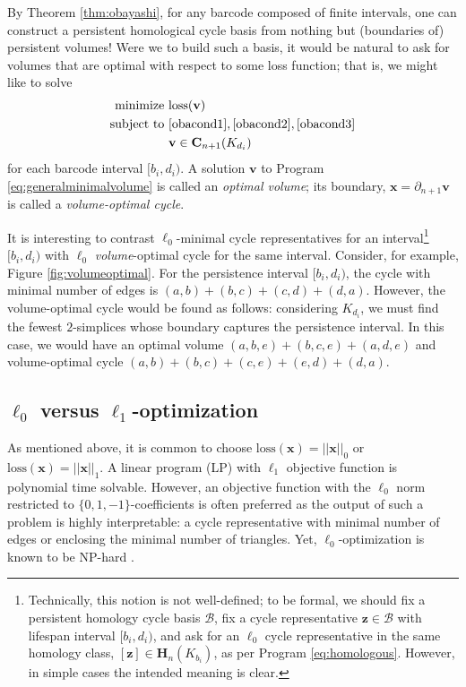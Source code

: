 \documentclass[utf8]{formatting_stuff/frontiersFPHY}
\newcommand{\Chains}{\mathbf{C}}
\newcommand{\Homologies}[0]{\mathbf{H}}
\newcommand{\optimalrep}{\mathbf{x}}
\newcommand{\cycle}{{\mathbf z}}
\newcommand{\fig}{Figure }
\newcommand{\volvec}{\mathbf{v}}
\newcommand{\loss}{\mathrm{loss}}
\newcommand{\pr}{Program }
\newcommand{\hcyclebasis}{\mathcal B}
\theoremstyle{plain}
\theoremstyle{definition}
\begin{document}
By Theorem \ref{thm:obayashi}, for any barcode composed of finite intervals, one can construct a persistent homological cycle basis from nothing but (boundaries of) persistent volumes!  Were we to build such a basis, it would be natural to ask for volumes that are optimal with respect to some loss function; that is, we might like to solve
\begin{align}
\begin{split}
    \text{minimize } & \loss(\volvec) \\
    \text{subject to } 
    & \eqref{obacond1}, \eqref{obacond2}, \eqref{obacond3}\\
    & \textbf{v} \in \Chains_{n+1}(K_{d_i}) 
\end{split}
\label{eq:generalminimalvolume}
\end{align}
for each barcode interval $[b_i, d_i)$.  A solution $\volvec$ to \pr \eqref{eq:generalminimalvolume} is called an \emph{optimal volume}; its boundary, $\optimalrep=\partial_{n+1}\volvec$ is called a \emph{volume-optimal cycle}.

It is interesting to contrast $\ell_0$-minimal cycle representatives for an interval\footnote{Technically, this notion is not well-defined; to be formal, we should fix a persistent homology cycle basis $\hcyclebasis$, fix a cycle representative $\cycle \in \hcyclebasis$ with lifespan interval $[b_i, d_i)$, and ask for an $\ell_0$ cycle representative in the same homology class, $[\cycle] \in \Homologies_n(K_{b_i})$, as per \pr \eqref{eq:homologous}.  However, in simple cases the intended meaning is clear.} $[b_i, d_i)$ with  $\ell_0$ \emph{volume}-optimal cycle for the same interval.  Consider, for example, \fig \ref{fig:volumeoptimal}.  For the persistence interval $[b_i,d_i)$, the cycle with minimal number of edges is $(a,b) + (b,c) + (c,d)  + (d,a)$. However, the volume-optimal cycle would be found as follows: considering $K_{d_i}$, we must find the fewest $2$-simplices whose boundary captures the persistence interval. In this case, we would have an optimal volume  $(a,b,e) + (b,c,e) + (a,d,e)$ and volume-optimal cycle $(a,b)+ (b,c) + (c,e) + (e,d)+ (d,a)$.

\subsection{$\ell_0$ versus $\ell_1$-optimization} \label{secl0l1}

As mentioned above, it is common to choose $\loss(\optimalrep) = ||\optimalrep||_0$ or $\loss(\optimalrep) = ||\optimalrep||_1$. A linear program (LP) with $\ell_1$ objective function is polynomial time solvable. However, an objective function with the $\ell_0$ norm restricted to $\{0,1,-1\}$-coefficients is often preferred as the output of such a problem is highly interpretable: a cycle representative with minimal number of edges or enclosing the minimal number of triangles. Yet, $\ell_0$-optimization is known to be NP-hard \cite{NPhardL0}. 
\end{document}
